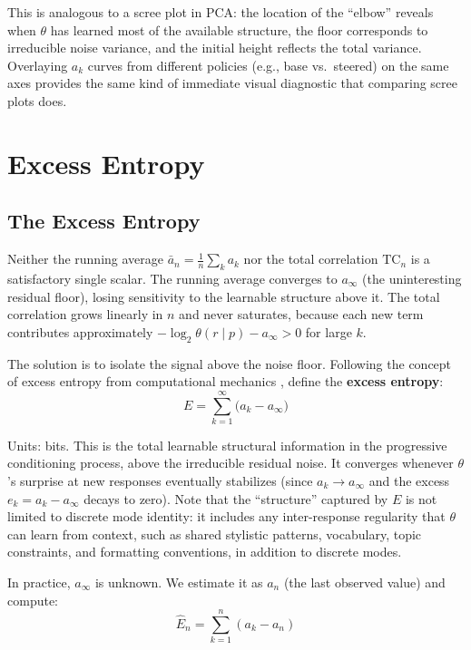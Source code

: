 \documentclass[11pt]{article}
\newcommand{\TC}{\mathrm{TC}}
\begin{document}
This is analogous to a scree plot in PCA: the location of the ``elbow'' reveals when $\theta$ has learned most of the available structure, the floor corresponds to irreducible noise variance, and the initial height reflects the total variance. Overlaying $a_k$ curves from different policies (e.g., base vs.\ steered) on the same axes provides the same kind of immediate visual diagnostic that comparing scree plots does.

\section{Excess Entropy}

\subsection{The Excess Entropy}\label{sec:excess-entropy}

Neither the running average $\bar{a}_n = \frac{1}{n}\sum_k a_k$ nor the total correlation $\TC_n$ is a satisfactory single scalar. The running average converges to $a_\infty$ (the uninteresting residual floor), losing sensitivity to the learnable structure above it. The total correlation grows linearly in $n$ and never saturates, because each new term contributes approximately $-\log_2 \theta(r \mid p) - a_\infty > 0$ for large $k$.

The solution is to isolate the signal above the noise floor. Following the concept of excess entropy from computational mechanics \citep{crutchfield2003regularities}, define the \textbf{excess entropy}:
\begin{equation}\label{eq:excess}
    E = \sum_{k=1}^{\infty}\bigl(a_k - a_\infty\bigr)
\end{equation}

Units: bits. This is the total learnable structural information in the progressive conditioning process, above the irreducible residual noise. It converges whenever $\theta$'s surprise at new responses eventually stabilizes (since $a_k \to a_\infty$ and the excess $e_k = a_k - a_\infty$ decays to zero). Note that the ``structure'' captured by $E$ is not limited to discrete mode identity: it includes any inter-response regularity that $\theta$ can learn from context, such as shared stylistic patterns, vocabulary, topic constraints, and formatting conventions, in addition to discrete modes.

In practice, $a_\infty$ is unknown. We estimate it as $a_n$ (the last observed value) and compute:
\begin{equation}\label{eq:excess-hat}
    \hat{E}_n = \sum_{k=1}^{n}(a_k - a_n)
\end{equation}
\end{document}
